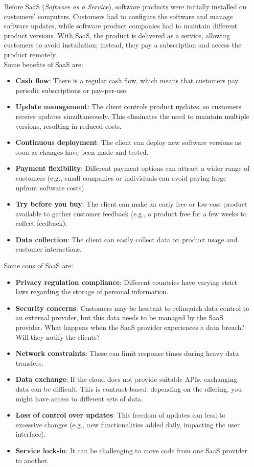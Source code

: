 Before SaaS (\textit{Software as a Service}), software products were initially installed on customers’ computers. Customers had to configure the software and manage software updates, while software product companies had to maintain different product versions. With SaaS, the product is delivered as a service, allowing customers to avoid installation; instead, they pay a subscription and access the product remotely.\\

\noindent
Some benefits of SaaS are:
\begin{itemize}
    \item \textbf{Cash flow}: There is a regular cash flow, which means that customers pay periodic subscriptions or pay-per-use.
    \item \textbf{Update management}: The client controls product updates, so customers receive updates simultaneously. This eliminates the need to maintain multiple versions, resulting in reduced costs.
    \item \textbf{Continuous deployment}: The client can deploy new software versions as soon as changes have been made and tested.
    \item \textbf{Payment flexibility}: Different payment options can attract a wider range of customers (e.g., small companies or individuals can avoid paying large upfront software costs).
    \item \textbf{Try before you buy}: The client can make an early free or low-cost product available to gather customer feedback (e.g., a product free for a few weeks to collect feedback).
    \item \textbf{Data collection}: The client can easily collect data on product usage and customer interactions.
\end{itemize}

\noindent
Some cons of SaaS are:
\begin{itemize}
    \item \textbf{Privacy regulation compliance}: Different countries have varying strict laws regarding the storage of personal information.
    \item \textbf{Security concerns}: Customers may be hesitant to relinquish data control to an external provider, but this data needs to be managed by the SaaS provider. What happens when the SaaS provider experiences a data breach? Will they notify the clients?
    \item \textbf{Network constraints}: These can limit response times during heavy data transfers.
    \item \textbf{Data exchange}: If the cloud does not provide suitable APIs, exchanging data can be difficult. This is contract-based: depending on the offering, you might have access to different sets of data.
    \item \textbf{Loss of control over updates}: This freedom of updates can lead to excessive changes (e.g., new functionalities added daily, impacting the user interface).
    \item \textbf{Service lock-in}: It can be challenging to move code from one SaaS provider to another.
\end{itemize}

